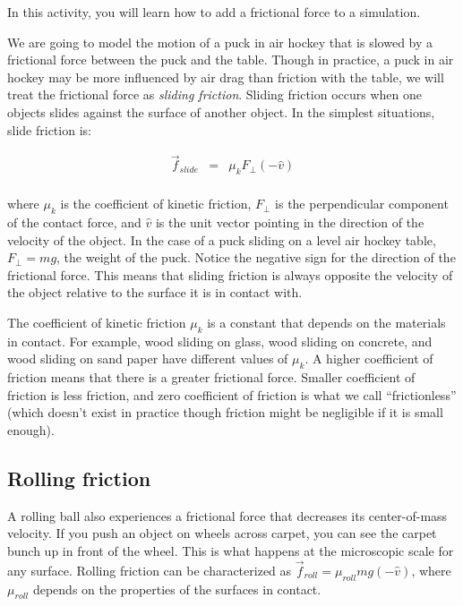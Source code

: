 

\apparatus


\longgoal

In this activity, you will learn how to add a frictional force to a simulation.
\introduction

We are going to model the motion of a puck in air hockey that is slowed by a frictional force between the puck and the table. Though in practice, a puck in air hockey may be more influenced by air drag than friction with the table, we will treat the frictional force as \emph{sliding friction}.  Sliding friction occurs when one objects slides against the surface of another object. In the simplest situations, slide friction is:

\begin{eqnarray*}
	\vec{f}_{slide} & = & \mu_k F_{\perp}(-\hat{v}) \\
\end{eqnarray*}

where $\mu_k$ is the coefficient of kinetic friction, $F_{\perp}$ is the perpendicular component of the contact force, and $\hat{v}$ is the unit vector pointing in the direction of the velocity of the object. In the case of a puck sliding on a level air hockey table, $F_{\perp}=mg$, the weight of the puck. Notice the negative sign for the direction of the frictional force. This means that sliding friction is always opposite the velocity of the object relative to the surface it is in contact with.

The coefficient of kinetic friction $\mu_k$ is a constant that depends on the materials in contact. For example, wood sliding on glass, wood sliding on concrete, and wood sliding on sand paper have different values of $\mu_k$. A higher coefficient of friction means that there is a greater frictional force. Smaller coefficient of friction is less friction, and zero coefficient of friction is what we call ``frictionless'' (which doesn't exist in practice though friction might be negligible if it is small enough).

\subsection*{Rolling friction}

A rolling ball also experiences a frictional force that decreases its center-of-mass velocity. If you push an object on wheels across carpet, you can see the carpet bunch up in front of the wheel. This is what happens at the microscopic scale for any surface.  Rolling friction can be characterized as $\vec{f}_{roll} = \mu_{roll} mg(-\hat{v})$, where $\mu_{roll}$ depends on the properties of the surfaces in contact.

